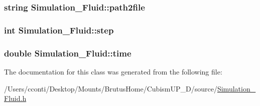 \subsubsection[{path2file}]{\setlength{\rightskip}{0pt plus 5cm}string Simulation\+\_\+\+Fluid\+::path2file\hspace{0.3cm}{\ttfamily [protected]}}\label{class_simulation___fluid_ada262b3831db9133a25f0ba8af00ff7b}
\hypertarget{class_simulation___fluid_a413104a68456556da195430ec33aa885}{}
\subsubsection[{step}]{\setlength{\rightskip}{0pt plus 5cm}int Simulation\+\_\+\+Fluid\+::step\hspace{0.3cm}{\ttfamily [protected]}}\label{class_simulation___fluid_a413104a68456556da195430ec33aa885}
\hypertarget{class_simulation___fluid_a743ea183f44eff7da35f693520f84bc8}{}
\subsubsection[{time}]{\setlength{\rightskip}{0pt plus 5cm}double Simulation\+\_\+\+Fluid\+::time\hspace{0.3cm}{\ttfamily [protected]}}\label{class_simulation___fluid_a743ea183f44eff7da35f693520f84bc8}


The documentation for this class was generated from the following file\+:\begin{DoxyCompactItemize}
\item 
/\+Users/cconti/\+Desktop/\+Mounts/\+Brutus\+Home/\+Cubism\+U\+P\+\_\+D/source/\hyperlink{_simulation___fluid_8h}{Simulation\+\_\+\+Fluid.\+h}\end{DoxyCompactItemize}
